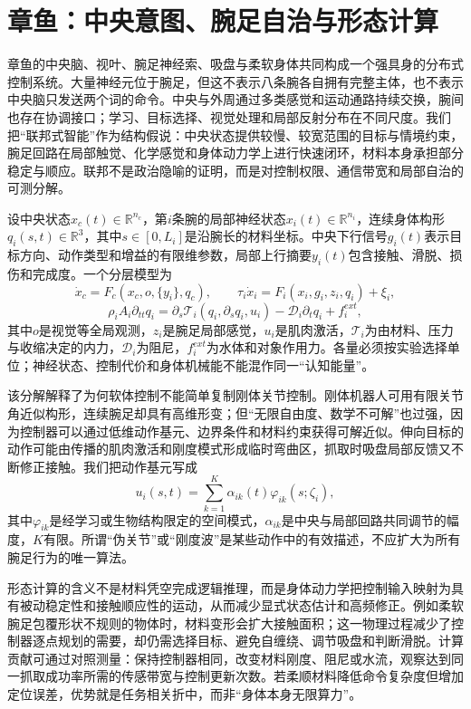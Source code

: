 \section{章鱼：中央意图、腕足自治与形态计算}
\label{sec:section_446}

章鱼的中央脑、视叶、腕足神经索、吸盘与柔软身体共同构成一个强具身的分布式控制系统。大量神经元位于腕足，但这不表示八条腕各自拥有完整主体，也不表示中央脑只发送两个词的命令。中央与外周通过多类感觉和运动通路持续交换，腕间也存在协调接口；学习、目标选择、视觉处理和局部反射分布在不同尺度。我们把“联邦式智能”作为结构假说：中央状态提供较慢、较宽范围的目标与情境约束，腕足回路在局部触觉、化学感觉和身体动力学上进行快速闭环，材料本身承担部分稳定与顺应。联邦不是政治隐喻的证明，而是对控制权限、通信带宽和局部自治的可测分解。

设中央状态$x_c(t)\in\mathbb R^{n_c}$，第$i$条腕的局部神经状态$x_i(t)\in\mathbb R^{n_i}$，连续身体构形$q_i(s,t)\in\mathbb R^3$，其中$s\in[0,L_i]$是沿腕长的材料坐标。中央下行信号$g_i(t)$表示目标方向、动作类型和增益的有限维参数，局部上行摘要$y_i(t)$包含接触、滑脱、损伤和完成度。一个分层模型为
\begin{equation}
 \dot x_c=F_c(x_c,o,\{y_i\},q_c),\qquad
 \tau_i\dot x_i=F_i(x_i,g_i,z_i,q_i)+\xi_i,
\end{equation}
\begin{equation}
 \rho_i A_i\partial_{tt}q_i=\partial_s\mathcal T_i(q_i,\partial_s q_i,u_i)-\mathcal D_i\partial_t q_i+f_i^{ext},
\end{equation}
其中$o$是视觉等全局观测，$z_i$是腕足局部感觉，$u_i$是肌肉激活，$\mathcal T_i$为由材料、压力与收缩决定的内力，$\mathcal D_i$为阻尼，$f_i^{ext}$为水体和对象作用力。各量必须按实验选择单位；神经状态、控制代价和身体机械能不能混作同一“认知能量”。

该分解解释了为何软体控制不能简单复制刚体关节控制。刚体机器人可用有限关节角近似构形，连续腕足却具有高维形变；但“无限自由度、数学不可解”也过强，因为控制器可以通过低维动作基元、边界条件和材料约束获得可解近似。伸向目标的动作可能由传播的肌肉激活和刚度模式形成临时弯曲区，抓取时吸盘局部反馈又不断修正接触。我们把动作基元写成
\begin{equation}
 u_i(s,t)=\sum_{k=1}^{K}\alpha_{ik}(t)\varphi_{ik}(s;\zeta_i),
\end{equation}
其中$\varphi_{ik}$是经学习或生物结构限定的空间模式，$\alpha_{ik}$是中央与局部回路共同调节的幅度，$K$有限。所谓“伪关节”或“刚度波”是某些动作中的有效描述，不应扩大为所有腕足行为的唯一算法。

形态计算的含义不是材料凭空完成逻辑推理，而是身体动力学把控制输入映射为具有被动稳定性和接触顺应性的运动，从而减少显式状态估计和高频修正。例如柔软腕足包覆形状不规则的物体时，材料变形会扩大接触面积；这一物理过程减少了控制器逐点规划的需要，却仍需选择目标、避免自缠绕、调节吸盘和判断滑脱。计算贡献可通过对照测量：保持控制器相同，改变材料刚度、阻尼或水流，观察达到同一抓取成功率所需的传感带宽与控制更新次数。若柔顺材料降低命令复杂度但增加定位误差，优势就是任务相关折中，而非“身体本身无限算力”。

